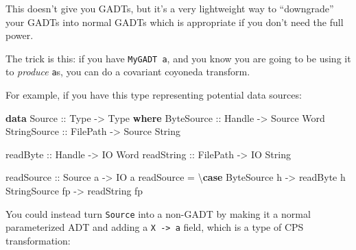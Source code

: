 \documentclass[]{article}
\newenvironment{Shaded}{}{}
\newcommand{\DataTypeTok}[1]{\textcolor[rgb]{0.56,0.13,0.00}{#1}}
\newcommand{\KeywordTok}[1]{\textcolor[rgb]{0.00,0.44,0.13}{\textbf{#1}}}
\newcommand{\NormalTok}[1]{#1}
\newcommand{\OtherTok}[1]{\textcolor[rgb]{0.00,0.44,0.13}{#1}}
\begin{document}
This doesn't give you GADTs, but it's a very lightweight way to ``downgrade''
your GADTs into normal GADTs which is appropriate if you don't need the full
power.

The trick is this: if you have \texttt{MyGADT\ a}, and you know you are going to
be using it to \emph{produce} \texttt{a}s, you can do a covariant coyoneda
transform.

For example, if you have this type representing potential data sources:

\begin{Shaded}
\begin{Highlighting}[]
\KeywordTok{data} \DataTypeTok{Source}\OtherTok{ ::} \DataTypeTok{Type} \OtherTok{{-}\textgreater{}} \DataTypeTok{Type} \KeywordTok{where}
    \DataTypeTok{ByteSource}\OtherTok{ ::} \DataTypeTok{Handle} \OtherTok{{-}\textgreater{}} \DataTypeTok{Source} \DataTypeTok{Word}
    \DataTypeTok{StringSource}\OtherTok{ ::} \DataTypeTok{FilePath} \OtherTok{{-}\textgreater{}} \DataTypeTok{Source} \DataTypeTok{String}

\OtherTok{readByte ::} \DataTypeTok{Handle} \OtherTok{{-}\textgreater{}} \DataTypeTok{IO} \DataTypeTok{Word}
\OtherTok{readString ::} \DataTypeTok{FilePath} \OtherTok{{-}\textgreater{}} \DataTypeTok{IO} \DataTypeTok{String}

\OtherTok{readSource ::} \DataTypeTok{Source}\NormalTok{ a }\OtherTok{{-}\textgreater{}} \DataTypeTok{IO}\NormalTok{ a}
\NormalTok{readSource }\OtherTok{=}\NormalTok{ \textbackslash{}}\KeywordTok{case}
    \DataTypeTok{ByteSource}\NormalTok{ h }\OtherTok{{-}\textgreater{}}\NormalTok{ readByte h}
    \DataTypeTok{StringSource}\NormalTok{ fp }\OtherTok{{-}\textgreater{}}\NormalTok{ readString fp}
\end{Highlighting}
\end{Shaded}

You could instead turn \texttt{Source} into a non-GADT by making it a normal
parameterized ADT and adding a \texttt{X\ -\textgreater{}\ a} field, which is a
type of CPS transformation:
\end{document}
